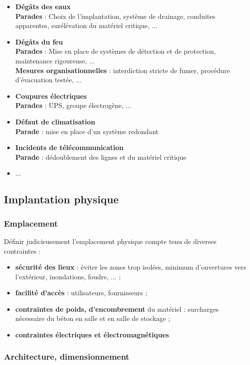 \documentclass[10pt,a4paper,oneside,titlepage]{report}
\newcommand{\titre}[1]{\textcolor{title}{#1}}
\newcommand{\strong}[1]{\textbf{\titre{#1}}}
\begin{document}
\begin{sffamily}
\begin{itemize}
\item \strong{Dégâts des eaux}\\
\textbf{Parades} : Choix de l'implantation, système de drainage, conduites apparentes, surélévation du matériel critique, ...
\item \strong{Dégâts du feu}\\
\textbf{Parades} : Mise en place de systèmes de détection et de protection, maintenance rigoureuse, ...\\
\textbf{Mesures organisationnelles} : interdiction stricte de fumer, procédure d'évacuation testée, ...
\item \strong{Coupures électriques}\\
\textbf{Parades} : UPS, groupe électrogène, ...
\item \strong{Défaut de climatisation}\\
\textbf{Parade} : mise en place d'un système redondant
\item \strong{Incidents de télécommunication}\\
\textbf{Parade} : dédoublement des lignes et du matériel critique
\item ...
\end{itemize}

\subsection{Implantation physique}

\subsubsection{Emplacement}

Définir judicieusement l'emplacement physique compte tenu de diverses contraintes :\begin{itemize}
\item \strong{sécurité des lieux} : éviter les zones trop isolées, minimum d'ouvertures vers l'extérieur, inondations, foudre, ... ;
\item \strong{facilité d'accès} : utilisateurs, fournisseurs ;
\item \strong{contraintes de poids, d'encombrement} du matériel : surcharges nécessaire du béton en salle et en salle de stockage ;
\item \strong{contraintes électriques et électromagnétiques}
\end{itemize}

\subsubsection{Architecture, dimensionnement}


\end{sffamily}
\end{document}
